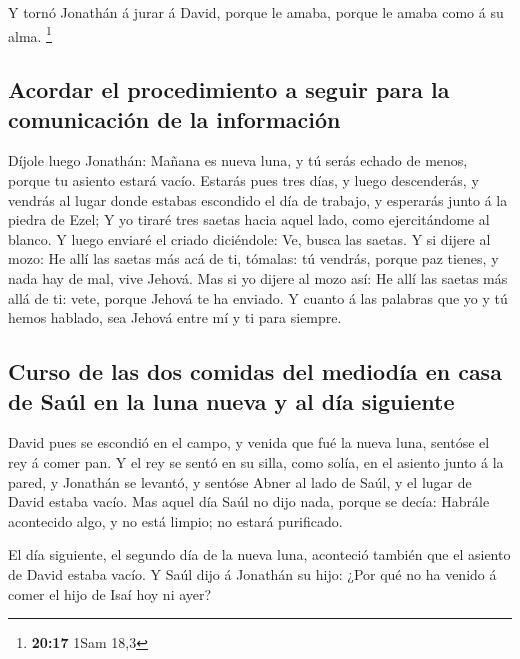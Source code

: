  Y tornó Jonathán á jurar á David, porque le amaba,
porque le amaba como á su alma. \footnote{\textbf{20:17} 1Sam 18,3}

\hypertarget{acordar-el-procedimiento-a-seguir-para-la-comunicaciuxf3n-de-la-informaciuxf3n}{%
\subsection{Acordar el procedimiento a seguir para la comunicación de la
información}\label{acordar-el-procedimiento-a-seguir-para-la-comunicaciuxf3n-de-la-informaciuxf3n}}

 Díjole luego Jonathán: Mañana es nueva luna, y tú serás
echado de menos, porque tu asiento estará vacío.  Estarás
pues tres días, y luego descenderás, y vendrás al lugar donde estabas
escondido el día de trabajo, y esperarás junto á la piedra de Ezel;
 Y yo tiraré tres saetas hacia aquel lado, como
ejercitándome al blanco.  Y luego enviaré el criado
diciéndole: Ve, busca las saetas. Y si dijere al mozo: He allí las
saetas más acá de ti, tómalas: tú vendrás, porque paz tienes, y nada hay
de mal, vive Jehová.  Mas si yo dijere al mozo así: He
allí las saetas más allá de ti: vete, porque Jehová te ha enviado.
 Y cuanto á las palabras que yo y tú hemos hablado, sea
Jehová entre mí y ti para siempre.

\hypertarget{curso-de-las-dos-comidas-del-medioduxeda-en-casa-de-sauxfal-en-la-luna-nueva-y-al-duxeda-siguiente}{%
\subsection{Curso de las dos comidas del mediodía en casa de Saúl en la
luna nueva y al día
siguiente}\label{curso-de-las-dos-comidas-del-medioduxeda-en-casa-de-sauxfal-en-la-luna-nueva-y-al-duxeda-siguiente}}

 David pues se escondió en el campo, y venida que fué la
nueva luna, sentóse el rey á comer pan.  Y el rey se
sentó en su silla, como solía, en el asiento junto á la pared, y
Jonathán se levantó, y sentóse Abner al lado de Saúl, y el lugar de
David estaba vacío.  Mas aquel día Saúl no dijo nada,
porque se decía: Habrále acontecido algo, y no está limpio; no estará
purificado.

 El día siguiente, el segundo día de la nueva luna,
aconteció también que el asiento de David estaba vacío. Y Saúl dijo á
Jonathán su hijo: ¿Por qué no ha venido á comer el hijo de Isaí hoy ni
ayer?

